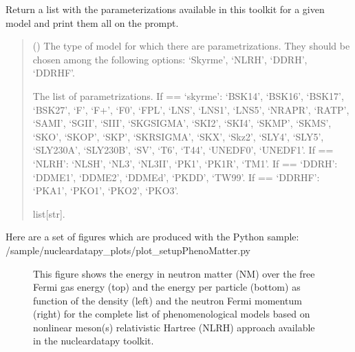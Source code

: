 \documentclass[letterpaper,10pt,english]{sphinxmanual}
\begin{document}
\begin{fulllineitems}
\label{\detokenize{source/api/setup_pheno_matter:nucleardatapy.setup_pheno_matter.params_pheno_matter}}
\pysigstartsignatures
\pysiglinewithargsret
{}
{}
{}
\pysigstopsignatures
\sphinxAtStartPar
Return a list with the parameterizations available in
this toolkit for a given model and print them all on the prompt.
\begin{quote}\begin{description}
\sphinxAtStartPar
{} () \textendash{} The type of model for which there are parametrizations.     They should be chosen among the following options: ‘Skyrme’, ‘NLRH’,     ‘DDRH’, ‘DDRHF’.

\sphinxAtStartPar
The list of parametrizations.     If  == ‘skyrme’: ‘BSK14’,     ‘BSK16’, ‘BSK17’, ‘BSK27’, ‘F\sphinxhyphen{}’, ‘F+’, ‘F0’, ‘FPL’, ‘LNS’, ‘LNS1’, ‘LNS5’,     ‘NRAPR’, ‘RATP’, ‘SAMI’, ‘SGII’, ‘SIII’, ‘SKGSIGMA’, ‘SKI2’, ‘SKI4’, ‘SKMP’,     ‘SKMS’, ‘SKO’, ‘SKOP’, ‘SKP’, ‘SKRSIGMA’, ‘SKX’, ‘Skz2’, ‘SLY4’, ‘SLY5’,     ‘SLY230A’, ‘SLY230B’, ‘SV’, ‘T6’, ‘T44’, ‘UNEDF0’, ‘UNEDF1’.     If  == ‘NLRH’: ‘NL\sphinxhyphen{}SH’, ‘NL3’, ‘NL3II’, ‘PK1’, ‘PK1R’, ‘TM1’.     If  == ‘DDRH’: ‘DDME1’, ‘DDME2’, ‘DDMEd’, ‘PKDD’, ‘TW99’.     If  == ‘DDRHF’: ‘PKA1’, ‘PKO1’, ‘PKO2’, ‘PKO3’.

\sphinxAtStartPar
list{[}str{]}.

\end{description}\end{quote}

\end{fulllineitems}


\sphinxAtStartPar
Here are a set of figures which are produced with the Python sample: /sample/nucleardatapy\_plots/plot\_setupPhenoMatter.py

\begin{figure}[htbp]
\centering
\capstart

\noindent{}
\caption{This figure shows the energy in neutron matter (NM) over the free Fermi gas energy (top) and the energy per particle (bottom) as function of the density (left) and the neutron Fermi momentum (right) for the complete list of phenomenological models based on non\sphinxhyphen{}linear meson(s) relativistic Hartree (NLRH) approach available in the nucleardatapy toolkit.}\label{\detokenize{source/api/setup_pheno_matter:id1}}\end{figure}
\end{document}
